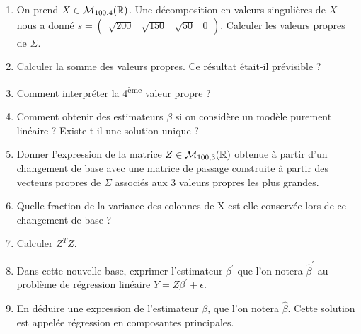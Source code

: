 \documentclass[solutions]{../exercices}
\begin{document}
\begin{exercice}
		\begin{enumerate}
			\item On prend $X \in \mathcal{M}_{100,4}(\mathbb{R})$. Une décomposition en valeurs singulières de $X$ nous a donné $s = \begin{pmatrix}\sqrt{200} & \sqrt{150} & \sqrt{50} & 0 \end{pmatrix}$. Calculer les valeurs propres de $\Sigma$.
			\item Calculer la somme des valeurs propres. Ce résultat était-il prévisible ?
			\item Comment interpréter la 4\textsuperscript{ème} valeur propre ?
			\item Comment obtenir des estimateurs $\beta$ si on considère un modèle purement linéaire ? Existe-t-il une solution unique ?
			\item Donner l'expression de la matrice $Z \in \mathcal{M}_{100,3}(\mathbb{R})$ obtenue à partir d'un changement de base avec une matrice de passage construite à partir des vecteurs propres de $\Sigma$ associés aux 3 valeurs propres les plus grandes.
			\item Quelle fraction de la variance des colonnes de X est-elle conservée lors de ce changement de base ?
			\item Calculer $Z^T Z$.
			\item Dans cette nouvelle base, exprimer l'estimateur $\beta^{'}$ que l'on notera $\hat{\beta}^{'}$ au problème de régression linéaire $Y = Z \beta^{'} + \epsilon$.
			\item En déduire une expression de l'estimateur $\beta$, que l'on notera $\hat{\beta}$. Cette solution est appelée régression en composantes principales.
		\end{enumerate}
	\end{exercice}
	
\end{document}
